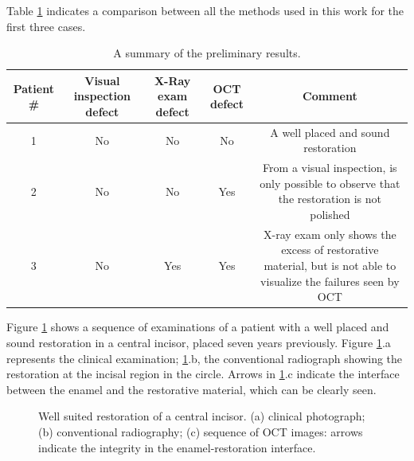 \documentclass[12pt,twoside,english]{book}
\renewcommand{\~}{\perispomeni}%
\providecommand{\tabularnewline}{\\}
\numberwithin{equation}{section}
\numberwithin{figure}{section}
\begin{document}
Table \ref{table:preliminary results} indicates a comparison between all the methods used in this work for the first three cases.
\begin{table}[H]
\noindent \begin{centering}
\begin{tabular}{ccccc}
\hline 
Patient \# & %
\begin{minipage}[t]{0.15\linewidth}%
Visual inspection defect%
\end{minipage} & %
\begin{minipage}[t]{0.15\linewidth}%
X-Ray exam defect%
\end{minipage} & %
\begin{minipage}[t]{0.1\linewidth}%
OCT defect%
\end{minipage} & Comment\tabularnewline
\hline
\hline 
1 & No & No & No & %
\begin{minipage}[t]{0.4\linewidth}%
A well placed and sound restoration%
\end{minipage}\tabularnewline
2 & No & No & Yes & %
\begin{minipage}[t]{0.4\linewidth}%
From a visual inspection, is only possible to observe that the restoration
is not polished%
\end{minipage}\tabularnewline
3 & No & Yes & Yes & %
\begin{minipage}[t]{0.4\linewidth}%
X-ray exam only shows the excess of restorative material, but is not
able to visualize the failures seen by OCT%
\end{minipage}\tabularnewline
\hline
\end{tabular}\caption{A summary of the preliminary results.\label{table:preliminary results}}
\par\end{centering}
\end{table}

Figure \ref{fig:good restoration} shows a sequence of examinations of a patient with a well placed and sound restoration in a central incisor, placed seven years previously. Figure \ref{fig:good restoration}.a represents the clinical examination; \ref{fig:good restoration}.b, the conventional radiograph showing the restoration at the incisal region in the circle. Arrows in \ref{fig:good restoration}.c indicate the interface between the enamel and the restorative material, which can be clearly seen.
\begin{figure}[h]
\noindent \centering{}
\caption{Well suited restoration of a central incisor. (a) clinical photograph; (b) conventional radiography; (c) sequence of OCT images: arrows indicate the integrity in the enamel-restoration interface.}
\label{fig:good restoration}
\end{figure}
\end{document}
